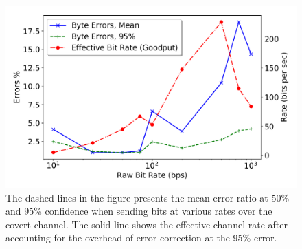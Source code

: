 \begin{figure}[!t]
  \includegraphics[width=.99\linewidth]{fig/channel_rate_3gb.pdf}
 \caption{The dashed lines in the figure presents the mean error ratio at 50\% and 95\%
 confidence when sending bits at various rates over the covert channel. The solid 
 line shows the effective channel rate after accounting for the overhead of 
 error correction at the 95\% error.
\label{fig:channel}}
\end{figure}


